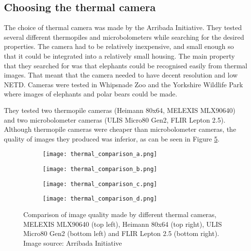 \subsection{ Choosing the thermal camera} \label{choosing_thermal}

The choice of thermal camera was made by the Arribada Initiative\cite{thermal_comparison}.
They tested several different thermopiles and microbolometers while searching for the desired properties.
The camera had to be relatively inexpensive, and small enough so that it could be integrated into a relatively small housing.
The main property that they searched for was that elephants could be recognised easily from thermal images.
That meant that the camera needed to have decent resolution and low NETD.
Cameras were tested in Whipsnade Zoo and the Yorkshire Wildlife Park where images of elephants and polar bears could be made.

They tested two thermopile cameras (Heimann 80x64, MELEXIS MLX90640) and two microbolometer cameras (ULIS Micro80 Gen2, FLIR Lepton 2.5).
Although thermopile cameras were cheaper than microbolometer cameras, the quality of images they produced was inferior, as can be seen in Figure \ref{thermal_comparison_images}.

\begin{figure}[ht]
    \begin{subfigure}{0.5\textwidth}
        \centering
        \texttt{[image: thermal\_comparison\_a.png]} 
        \label{thermal_comparison_a}
    \end{subfigure}
    \begin{subfigure}{0.5\textwidth}
        \centering
        \texttt{[image: thermal\_comparison\_b.png]} 
        \label{thermal_comparison_b}
    \end{subfigure}
    \begin{subfigure}{0.5\textwidth}
        \centering
        \texttt{[image: thermal\_comparison\_c.png]} 
        \label{thermal_comparison_c}
    \end{subfigure}
    \begin{subfigure}{0.5\textwidth}
        \centering
        \texttt{[image: thermal\_comparison\_d.png]} 
        \label{thermal_comparison_d}
    \end{subfigure}
\caption[Comparison of image quality made by different thermal cameras.]{Comparison of image quality made by different thermal cameras, MELEXIS MLX90640 (top left), Heimann 80x64 (top right), ULIS Micro80 Gen2 (bottom left) and FLIR Lepton 2.5 (bottom right). Image source: Arribada Initiative \cite{thermal_comparison}}
    \label{thermal_comparison_images}
\end{figure}

